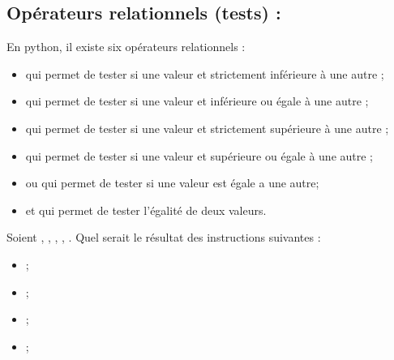 \documentclass[letterpaper,10pt,french]{sphinxmanual}
\begin{document}
\subsection{Opérateurs relationnels (tests) :}
\label{\detokenize{ch1:operateurs-relationnels-tests}}
\sphinxAtStartPar
En python, il existe six opérateurs relationnels :
\begin{itemize}
\item {} 
\sphinxAtStartPar
\sphinxcode{\sphinxupquote{\textless{}}} qui permet de tester si une valeur et strictement inférieure à une autre ;

\item {} 
\sphinxAtStartPar
\sphinxcode{\sphinxupquote{\textless{}=}} qui permet de tester si une valeur et inférieure ou égale à une autre ;

\item {} 
\sphinxAtStartPar
\sphinxcode{\sphinxupquote{\textgreater{}}} qui permet de tester si une valeur et strictement supérieure à une autre ;

\item {} 
\sphinxAtStartPar
\sphinxcode{\sphinxupquote{\textgreater{}=}} qui permet de tester si une valeur et supérieure ou égale à une autre ;

\item {} 
\sphinxAtStartPar
\sphinxcode{\sphinxupquote{!=}} ou \sphinxcode{\sphinxupquote{\textless{}\textgreater{}}} qui permet de tester si une valeur est égale a une autre;

\item {} 
\sphinxAtStartPar
et \sphinxcode{\sphinxupquote{==}} qui permet de tester l’égalité de deux valeurs.

\end{itemize}

\sphinxAtStartPar
Soient , , , , . Quel serait le résultat des instructions suivantes :
\begin{itemize}
\item {} 
\sphinxAtStartPar
{};

\item {} 
\sphinxAtStartPar
{};

\item {} 
\sphinxAtStartPar
{};

\item {} 
\sphinxAtStartPar
{};

\end{itemize}
\end{document}
